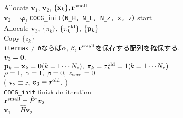 \documentclass[12pt,titlepage]{jarticle}
\renewenvironment{leftbar}{%
  \def\FrameCommand{\vrule width 1pt \hspace{0pt}}%
  \MakeFramed {\advance\hsize-\width \FrameRestore}}%
 {\endMakeFramed}
\begin{document}
\noindent
Allocate ${\boldsymbol v}_1$, ${\boldsymbol v}_2$, $\{{\bf x}_k\}, {\bf r}^{\rm small}$
\\ 
${\boldsymbol v}_2 = {\boldsymbol \varphi_j}$
\vspace{-1em}
\begin{leftbar}
  \noindent
  \verb|COCG_init(N_H, N_L, N_z, x, z)| start
  \\ \hspace{0.5cm}
  Allocate ${\boldsymbol v}_3$, $\{\pi_k\}$, $\{\pi_k^{\rm old}\}$, $\{{\bf p}_k\}$
  \\ \hspace{0.5cm}
  Copy $\{z_k\}$
  \\ \hspace{0.5cm}
  \verb|itermax|$\neq$\verb|0|ならば$\alpha$, $\beta$, ${\bf r}^{\rm small}$を保存する配列を確保する.
  \\ \hspace{0.5cm}
  ${\boldsymbol v}_3 = {\bf 0}$,
  \\ \hspace{0.5cm}
  ${\bf p}_{k} = {\bf x}_k = {\bf 0}(k=1 \cdots N_z),\; \pi_k=\pi_k^{\rm old} = 1(k=1 \cdots N_z)$ 
  \\ \hspace{0.5cm}
  $\rho = 1,\; \alpha = 1,\; \beta=0,\; z_{\rm seed}=0$ 
  \\ \hspace{0.5cm}
  (
  ${\boldsymbol v}_2 \equiv {\boldsymbol r}$, 
  ${\boldsymbol v}_3 \equiv {\boldsymbol r}^{\rm old}$. )
  \\
  \verb|COCG_init| finish
\end{leftbar}
\vspace{-1em}
\noindent
do iteration
\\\hspace{0.5cm}
${\bf r}^{\rm small} = {\hat P}^\dagger {\boldsymbol v}_2$
\\\hspace{0.5cm}
${\boldsymbol v}_1 = {\hat H} {\boldsymbol v}_2$
\vspace{-1em}
\end{document}
